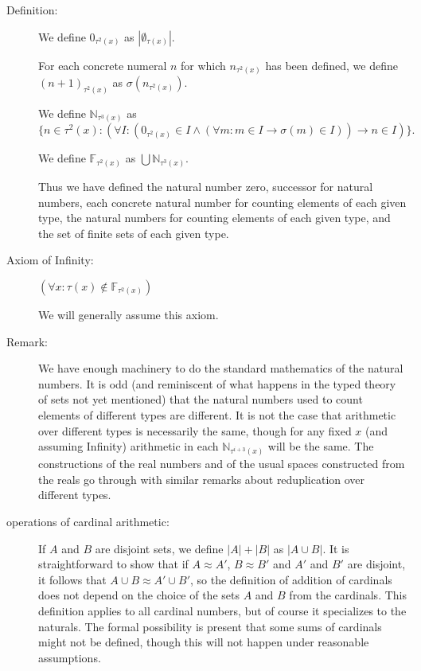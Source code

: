 \documentclass[12pt]{article}
\begin{document}
\begin{description}
\item[Definition:]  We define $0_{\tau^2(x)}$ as $|\emptyset_{\tau(x)}|$.  

For each concrete numeral $n$ for which $n_{\tau^2(x)}$ has been defined,
we define $(n+1)_{\tau^2(x)}$ as $\sigma(n_{\tau^2(x)})$.

We define ${\mathbb N}_{\tau^3(x)}$ as $$\{n \in \tau^2(x):(\forall I:(0_{\tau^2(x)} \in I \wedge (\forall m:m \in I \rightarrow \sigma(m) \in I)) \rightarrow n \in I)\}.$$

We define ${\mathbb F}_{\tau^2(x)}$ as $\bigcup {\mathbb N}_{\tau^3(x)}$.

Thus we have defined the natural number zero, successor for natural numbers, each concrete natural number for counting elements of each given type,
the natural numbers for counting elements of each given type, and the set of finite sets of each given type.

\item[Axiom of Infinity:]  $(\forall x:\tau(x) \not\in {\mathbb F}_{\tau^2(x)})$

We will generally assume this axiom.

\item[Remark:]  We have enough machinery to do the standard mathematics of the natural numbers.  It is odd (and reminiscent of what happens in the typed theory of sets not yet mentioned) that the natural numbers used to count elements of different types are different.  It is not the case that arithmetic over different types is necessarily the same, though for any fixed $x$ (and assuming Infinity) arithmetic in each ${\mathbb N}_{\tau^{i+3}(x)}$ will be the same.  The constructions of the real numbers and of the usual spaces constructed from the reals go through with similar remarks about reduplication over different types.

\item[ operations of cardinal arithmetic:]  If $A$ and $B$ are disjoint sets, we define $|A|+|B|$ as $|A \cup B|$.  It is straightforward to show that if $A \approx A'$, $B \approx B'$ and $A'$ and $B'$ are disjoint, it follows that $A \cup B \approx A' \cup B'$, so the definition of addition of cardinals does not depend on the choice of the sets $A$ and $B$ from the cardinals.
This definition applies to all cardinal numbers, but of course it specializes to the naturals.   The formal possibility is present that some sums of cardinals might not be defined, though this will not happen under reasonable assumptions.


\end{description}
\end{document}
